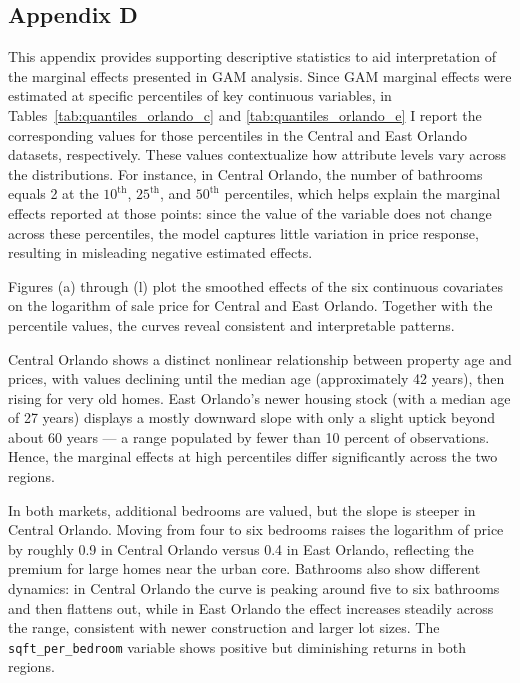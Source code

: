 \subsection*{Appendix D}

This appendix provides supporting descriptive statistics to aid interpretation of the marginal effects presented in GAM analysis. Since GAM marginal effects were estimated at specific percentiles of key continuous variables, in Tables~\ref{tab:quantiles_orlando_c} and \ref{tab:quantiles_orlando_e} I report the corresponding values for those percentiles in the Central and East Orlando datasets, respectively. These values contextualize how attribute levels vary across the distributions. For instance, in Central Orlando, the number of bathrooms equals 2 at the $10^{\text{th}}$, $25^{\text{th}}$, and $50^{\text{th}}$ percentiles, which helps explain the marginal effects reported at those points: since the value of the variable does not change across these percentiles, the model captures little variation in price response, resulting in misleading negative estimated effects.

Figures (a) through (l) plot the smoothed effects of the six continuous covariates on the logarithm of sale price for Central and East Orlando. Together with the percentile values, the curves reveal consistent and interpretable patterns. 

Central Orlando shows a distinct nonlinear relationship between property age and prices, with values declining until the median age (approximately 42 years), then rising for very old homes. East Orlando’s newer housing stock (with a median age of 27 years) displays a mostly downward slope with only a slight uptick beyond about 60 years --- a range populated by fewer than 10 percent of observations. Hence, the marginal effects at high percentiles differ significantly across the two regions.







In both markets, additional bedrooms are valued, but the slope is steeper in Central Orlando. Moving from four to six bedrooms raises the logarithm of price by roughly 0.9 in Central Orlando versus 0.4 in East Orlando, reflecting the premium for large homes near the urban core. Bathrooms also show different dynamics: in Central Orlando the curve is peaking around five to six bathrooms and then flattens out, while in East Orlando the effect increases steadily across the range, consistent with newer construction and larger lot sizes. The \texttt{sqft\_per\_bedroom} variable shows positive but diminishing returns in both regions. 

